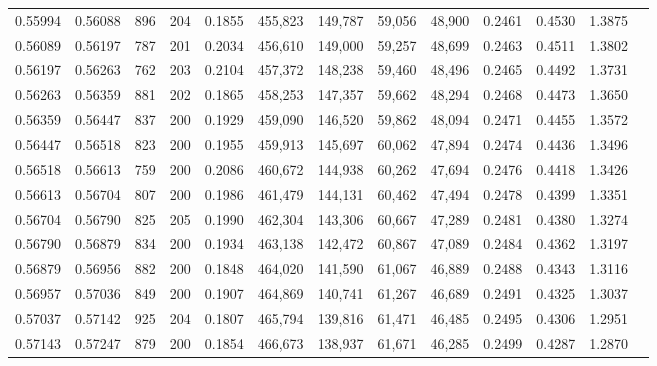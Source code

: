 \begin{tabular}{rrrrrrrrrrrrr}
0.55994 & 0.56088 &   896 & 204 &                                     0.1855 & 455,823 & 149,787 &  59,056 &  48,900 & 0.2461 & 0.4530 & 1.3875 \\
0.56089 & 0.56197 &   787 & 201 &                                     0.2034 & 456,610 & 149,000 &  59,257 &  48,699 & 0.2463 & 0.4511 & 1.3802 \\
0.56197 & 0.56263 &   762 & 203 &                                     0.2104 & 457,372 & 148,238 &  59,460 &  48,496 & 0.2465 & 0.4492 & 1.3731 \\
0.56263 & 0.56359 &   881 & 202 &                                     0.1865 & 458,253 & 147,357 &  59,662 &  48,294 & 0.2468 & 0.4473 & 1.3650 \\
0.56359 & 0.56447 &   837 & 200 &                                     0.1929 & 459,090 & 146,520 &  59,862 &  48,094 & 0.2471 & 0.4455 & 1.3572 \\
0.56447 & 0.56518 &   823 & 200 &                                     0.1955 & 459,913 & 145,697 &  60,062 &  47,894 & 0.2474 & 0.4436 & 1.3496 \\
0.56518 & 0.56613 &   759 & 200 &                                     0.2086 & 460,672 & 144,938 &  60,262 &  47,694 & 0.2476 & 0.4418 & 1.3426 \\
0.56613 & 0.56704 &   807 & 200 &                                     0.1986 & 461,479 & 144,131 &  60,462 &  47,494 & 0.2478 & 0.4399 & 1.3351 \\
0.56704 & 0.56790 &   825 & 205 &                                     0.1990 & 462,304 & 143,306 &  60,667 &  47,289 & 0.2481 & 0.4380 & 1.3274 \\
0.56790 & 0.56879 &   834 & 200 &                                     0.1934 & 463,138 & 142,472 &  60,867 &  47,089 & 0.2484 & 0.4362 & 1.3197 \\
0.56879 & 0.56956 &   882 & 200 &                                     0.1848 & 464,020 & 141,590 &  61,067 &  46,889 & 0.2488 & 0.4343 & 1.3116 \\
0.56957 & 0.57036 &   849 & 200 &                                     0.1907 & 464,869 & 140,741 &  61,267 &  46,689 & 0.2491 & 0.4325 & 1.3037 \\
0.57037 & 0.57142 &   925 & 204 &                                     0.1807 & 465,794 & 139,816 &  61,471 &  46,485 & 0.2495 & 0.4306 & 1.2951 \\
0.57143 & 0.57247 &   879 & 200 &                                     0.1854 & 466,673 & 138,937 &  61,671 &  46,285 & 0.2499 & 0.4287 & 1.2870 \\

\end{tabular}
